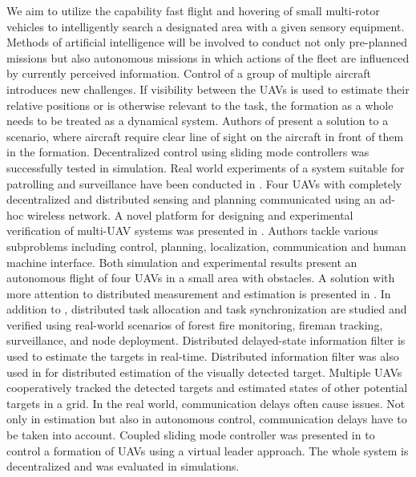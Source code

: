 \documentclass[a4paper,11pt,titlepage,twoside]{book}
\begin{document}
We aim to utilize the capability fast flight and hovering of small multi-rotor vehicles to intelligently search a designated area with a given sensory equipment.
Methods of artificial intelligence will be involved to conduct not only pre-planned missions but also autonomous missions in which actions of the fleet are influenced by currently perceived information.
Control of a group of multiple aircraft introduces new challenges.
If visibility between the UAVs is used to estimate their relative positions or is otherwise relevant to the task, the formation as a whole needs to be treated as a dynamical system.
Authors of \cite{stipanovic2004decentralized} present a solution to a scenario, where aircraft require clear line of sight on the aircraft in front of them in the formation.
Decentralized control using sliding mode controllers was successfully tested in simulation.
Real world experiments of a system suitable for patrolling and surveillance have been conducted in \cite{ryan2007decentralized}.
Four \acp{UAV} with completely decentralized and distributed sensing and planning communicated using an ad-hoc wireless network.
A novel platform for designing and experimental verification of multi-\ac{UAV} systems was presented in \cite{sanchez2016reliable}.
Authors tackle various subproblems including control, planning, localization, communication and human machine interface.
Both simulation and experimental results present an autonomous flight of four \acp{UAV} in a small area with obstacles.
A solution with more attention to distributed measurement and estimation is presented in \cite{maza2011distributed}.
In addition to \cite{sanchez2016reliable}, distributed task allocation and task synchronization are studied and verified using real-world scenarios of forest fire monitoring, fireman tracking, surveillance, and node deployment.
Distributed delayed-state information filter \cite{capitan2009delayed, merino2007multi} is used to estimate the targets in real-time.
Distributed information filter was also used in \cite{merino2007multi} for distributed estimation of the visually detected target.
Multiple \acp{UAV} cooperatively tracked the detected targets and estimated states of other potential targets in a grid.
In the real world, communication delays often cause issues.
Not only in estimation but also in autonomous control, communication delays have to be taken into account.
Coupled sliding mode controller was presented in \cite{rezaee2013motion} to control a formation of \acp{UAV} using a virtual leader approach.
The whole system is decentralized and was evaluated in simulations.
\end{document}
